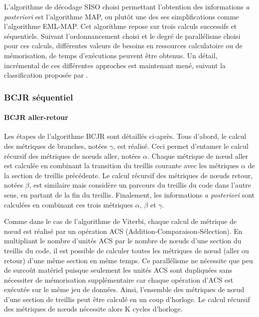 L'algorithme de décodage SISO choisi permettant l’obtention des informations \textit{a posteriori} est l'algorithme MAP, 
ou plutôt une des ses simplifications comme l'algorithme EML-MAP. Cet algorithme repose sur trois calculs successifs et 
séquentiels. Suivant l'ordonnancement choisi et le degré de parallélisme choisi pour ces calculs, différentes valeurs 
de besoins en ressources calculatoire ou de mémorisation, de temps d'exécutions peuvent être obtenus. Un détail, 
incrémental de ces différentes approches est maintenant mené, suivant la classification proposée par \cite{Muller2010}.

\subsubsection{BCJR séquentiel}
\paragraph*{BCJR aller-retour}
Les étapes de l'algorithme BCJR sont détaillés ci-après. Tous d'abord, le calcul des métriques de branches, notées 
$\gamma$, est réalisé. Ceci permet d’entamer le calcul récursif des métriques de nœuds aller, notées $\alpha$. Chaque 
métrique de nœud aller est calculée en combinant la transition du treillis courante avec les métriques $\alpha$ de la section de treillis précédente. Le calcul récursif des métriques de nœuds retour, notées $\beta$, est similaire mais
considère un parcours du treillis du code dans l'autre sens, en partant de la fin du treillis. Finalement, les 
informations \textit{a posteriori} sont calculées en combinant ces trois métriques $\alpha$, $\beta$ et $\gamma$. 

Comme dans le cas de l'algorithme de Viterbi, chaque calcul de métrique de nœud est réalisé par un opération ACS 
(Addition-Comparaison-Sélection). En multipliant le nombre d'unités ACS par le nombre de nœuds d'une section du treillis 
du code, il est possible de calculer toutes les métriques de nœud (aller ou retour) d'une même section en même temps. Ce
parallélisme ne nécessite que peu de surcoût matériel puisque seulement les unités ACS sont dupliquées sans nécessiter
de mémorisation supplémentaire car chaque opération d'ACS est exécutée sur le même jeu de données. Ainsi, l'ensemble des
métriques de nœud d'une section de treillis peut être calculé en un coup d'horloge. Le calcul récursif des métriques de 
nœuds nécessite alors K cycles d'horloge.

